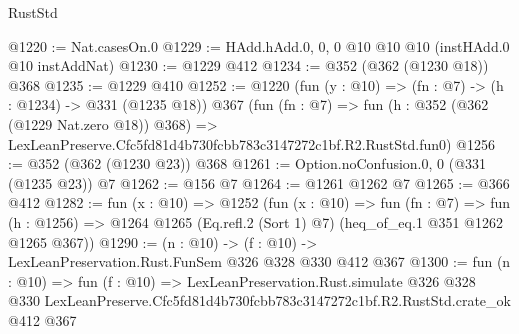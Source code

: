 \begin{lexlean}{RustStd}
\begin{coremodule}
@1220 := Nat.casesOn.{0}
@1229 := HAdd.hAdd.{0, 0, 0} @10 @10 @10 (instHAdd.{0} @10 instAddNat)
@1230 := @1229 @412
@1234 := @352 (@362 (@1230 @18)) @368
@1235 := @1229 @410
@1252 := @1220
    (fun (y : @10) => (fn : @7) -> (h : @1234) -> @331 (@1235 @18))
    @367
    (fun (fn : @7) =>
    fun (h : @352 (@362 (@1229 Nat.zero @18)) @368) =>
    LexLeanPreserve.Cfc5fd81d4b730fcbb783c3147272c1bf.R2.RustStd.fun0)
@1256 := @352 (@362 (@1230 @23)) @368
@1261 := Option.noConfusion.{0, 0} (@331 (@1235 @23)) @7
@1262 := @156 @7
@1264 := @1261 @1262 @7
@1265 := @366 @412
@1282 := fun (x : @10) =>
  @1252
    (fun (x : @10) =>
    fun (fn : @7) =>
    fun (h : @1256) => @1264 @1265 (Eq.refl.{2} (Sort 1) @7) (heq_of_eq.{1} @351 @1262 @1265 @367))
@1290 := (n : @10) -> (f : @10) -> LexLeanPreservation.Rust.FunSem @326 @328 @330 @412 @367
@1300 := fun (n : @10) =>
  fun (f : @10) =>
  LexLeanPreservation.Rust.simulate
    @326
    @328
    @330
    LexLeanPreserve.Cfc5fd81d4b730fcbb783c3147272c1bf.R2.RustStd.crate_ok
    @412
    @367
\end{coremodule}
\end{lexlean}
